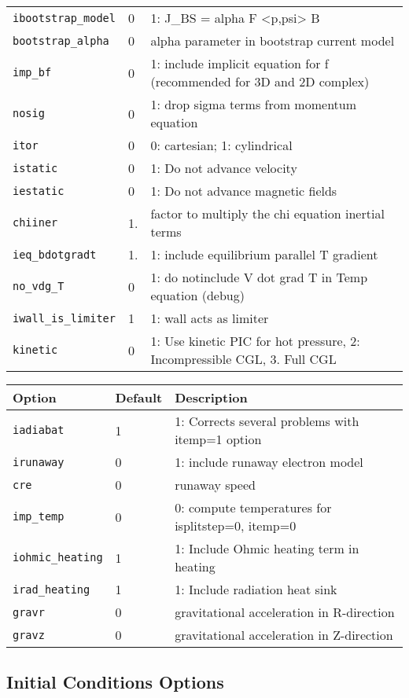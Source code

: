 \begin{tabular}{llp{3in}}
  \texttt{ibootstrap\_model} & 0 & 1: J\_BS = alpha F <p,psi> B \\
  \texttt{bootstrap\_alpha} & 0 & alpha parameter in bootstrap current model \\
  \texttt{imp\_bf} & 0 & 1: include implicit equation for f (recommended for
  3D and 2D complex) \\
  \texttt{nosig} & 0 & 1: drop sigma terms from momentum equation \\
  \texttt{itor}   & 0   & 0: cartesian; 1: cylindrical\\
  \texttt{istatic}& 0   & 1: Do not advance velocity\\
  \texttt{iestatic}&0   & 1: Do not advance magnetic fields\\
  \texttt{chiiner} & 1. & factor to multiply the chi equation inertial terms \\
  \texttt{ieq\_bdotgradt} & 1. & 1: include equilibrium parallel T gradient \\
  \texttt{no\_vdg\_T} & 0 & 1: do notinclude V dot grad T in Temp equation (debug) \\
  \texttt{iwall\_is\_limiter} & 1 & 1: wall acts as limiter \\
  \texttt{kinetic} & 0 & 1: Use kinetic PIC for hot pressure, 
                         2: Incompressible CGL,
                         3. Full CGL  
\end{tabular}

\begin{tabular}{llp{3in}}
  \textbf{Option}&\textbf{Default}&\textbf{Description}\\
  \hline
  \texttt{iadiabat} & 1 & 1: Corrects several problems with itemp=1 option \\
  \texttt{irunaway} & 0 & 1:  include runaway electron model \\
  \texttt{cre} & 0 & runaway speed \\
  \texttt{imp\_temp} & 0 & 0: compute temperatures for isplitstep=0, itemp=0 \\
  \texttt{iohmic\_heating} & 1 & 1: Include Ohmic heating term in heating \\
  \texttt{irad\_heating} & 1 & 1: Include radiation heat sink \\
  \texttt{gravr} & 0 & gravitational acceleration in R-direction \\
  \texttt{gravz} & 0 & gravitational acceleration in Z-direction 
\end{tabular}

\subsection{Initial Conditions Options}

